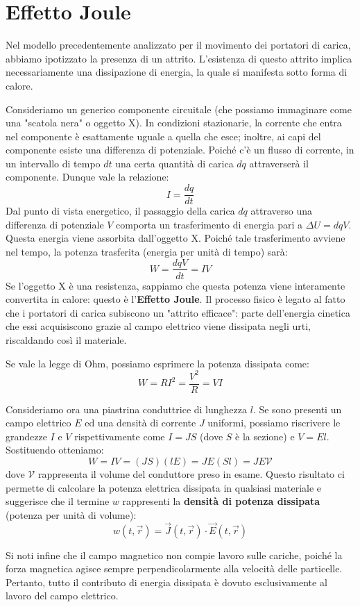 \documentclass{book}
\begin{document}
\section{Effetto Joule}
Nel modello precedentemente analizzato per il movimento dei portatori di carica, abbiamo ipotizzato la presenza di un attrito. L'esistenza di questo attrito implica necessariamente una dissipazione di energia, la quale si manifesta sotto forma di calore.

Consideriamo un generico componente circuitale (che possiamo immaginare come una "scatola nera" o oggetto X). In condizioni stazionarie, la corrente che entra nel componente è esattamente uguale a quella che esce; inoltre, ai capi del componente esiste una differenza di potenziale.
Poiché c'è un flusso di corrente, in un intervallo di tempo $dt$ una certa quantità di carica $dq$ attraverserà il componente. Dunque vale la relazione:
$$
I = \frac{dq}{dt}
$$
Dal punto di vista energetico, il passaggio della carica $dq$ attraverso una differenza di potenziale $V$ comporta un trasferimento di energia pari a $\Delta U = dqV$. Questa energia viene assorbita dall'oggetto X. Poiché tale trasferimento avviene nel tempo, la potenza trasferita (energia per unità di tempo) sarà:
$$
W = \frac{dqV}{dt}= IV
$$
Se l'oggetto X è una resistenza, sappiamo che questa potenza viene interamente convertita in calore: questo è l'\textbf{Effetto Joule}.
Il processo fisico è legato al fatto che i portatori di carica subiscono un "attrito efficace": parte dell'energia cinetica che essi acquisiscono grazie al campo elettrico viene dissipata negli urti, riscaldando così il materiale.

Se vale la legge di Ohm, possiamo esprimere la potenza dissipata come:
$$
W=RI^2=\frac{V^2}{R}=VI
$$

Consideriamo ora una piastrina conduttrice di lunghezza $l$. Se sono presenti un campo elettrico $E$ ed una densità di corrente $J$ uniformi, possiamo riscrivere le grandezze $I$ e $V$ rispettivamente come $I = JS$ (dove $S$ è la sezione) e $V = El$. Sostituendo otteniamo:
$$
W = IV = (JS) (lE) = J E (Sl) = J E \mathcal{V}
$$
dove $\mathcal{V}$ rappresenta il volume del conduttore preso in esame.
Questo risultato ci permette di calcolare la potenza elettrica dissipata in qualsiasi materiale e suggerisce che il termine $w$ rappresenti la \textbf{densità di potenza dissipata} (potenza per unità di volume):
$$w(t,\vec{r})= \vec{J}(t,\vec{r}) \cdot \vec{E}(t,\vec{r})$$

Si noti infine che il campo magnetico non compie lavoro sulle cariche, poiché la forza magnetica agisce sempre perpendicolarmente alla velocità delle particelle. Pertanto, tutto il contributo di energia dissipata è dovuto esclusivamente al lavoro del campo elettrico.
\end{document}

